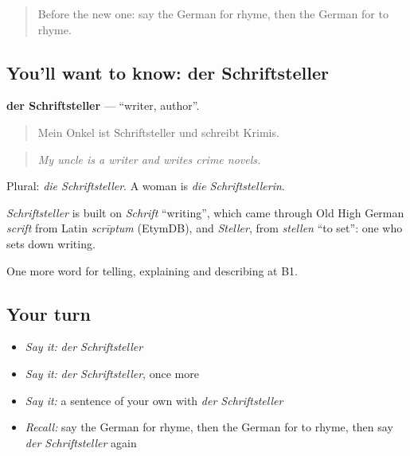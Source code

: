 \label{lesson:GE-C521-schriftsteller}



\begin{quote}
Before the new one: say the German for rhyme, then the German for to rhyme.
\end{quote}

\subsection*{You'll want to know: der Schriftsteller}
\textbf{der Schriftsteller} — \textquotedblleft{}writer, author\textquotedblright{}.

\begin{quote}
Mein Onkel ist Schriftsteller und schreibt Krimis.
\end{quote}

\begin{quote}
\emph{My uncle is a writer and writes crime novels.}
\end{quote}

Plural: \emph{die Schriftsteller}. A woman is \emph{die Schriftstellerin}.

\begin{cousinweb}
\emph{Schriftsteller} is built on \emph{Schrift} \textquotedblleft{}writing\textquotedblright{}, which came through Old High German \emph{scrift} from Latin \emph{scrīptum} (EtymDB), and \emph{Steller}, from \emph{stellen} \textquotedblleft{}to set\textquotedblright{}: one who sets down writing.
\end{cousinweb}

\begin{grammarlens}[title={What you've built}]
One more word for telling, explaining and describing at B1.
\end{grammarlens}

\subsection*{Your turn}
\begin{itemize}
\raggedright
  \item \emph{Say it:} \emph{der Schriftsteller}
  \item \emph{Say it:} \emph{der Schriftsteller}, once more
  \item \emph{Say it:} a sentence of your own with \emph{der Schriftsteller}
  \item \emph{Recall:} say the German for rhyme, then the German for to rhyme, then say \emph{der Schriftsteller} again
\end{itemize}

